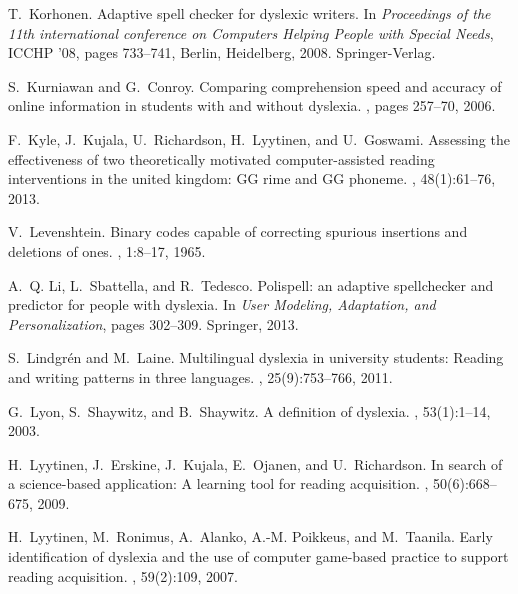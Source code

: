 \documentclass[letterpaper]{sig-alternate-2013}
\begin{document}
\begin{thebibliography}{10}
T.~Korhonen.
\newblock Adaptive spell checker for dyslexic writers.
\newblock In {\em Proceedings of the 11th international conference on Computers
  Helping People with Special Needs}, ICCHP '08, pages 733--741, Berlin,
  Heidelberg, 2008. Springer-Verlag.

S.~Kurniawan and G.~Conroy.
\newblock Comparing comprehension speed and accuracy of online information in
  students with and without dyslexia.
, pages 257--70,
  2006.

F.~Kyle, J.~Kujala, U.~Richardson, H.~Lyytinen, and U.~Goswami.
\newblock Assessing the effectiveness of two theoretically motivated
  computer-assisted reading interventions in the united kingdom: {GG} rime and
  {GG} phoneme.
, 48(1):61--76, 2013.

V.~Levenshtein.
\newblock Binary codes capable of correcting spurious insertions and deletions
  of ones.
, 1:8--17, 1965.

A.~Q. Li, L.~Sbattella, and R.~Tedesco.
\newblock Polispell: an adaptive spellchecker and predictor for people with
  dyslexia.
\newblock In {\em User Modeling, Adaptation, and Personalization}, pages
  302--309. Springer, 2013.

S.~Lindgr{\'e}n and M.~Laine.
\newblock Multilingual dyslexia in university students: Reading and writing
  patterns in three languages.
, 25(9):753--766, 2011.

G.~Lyon, S.~Shaywitz, and B.~Shaywitz.
\newblock A definition of dyslexia.
, 53(1):1--14, 2003.

H.~Lyytinen, J.~Erskine, J.~Kujala, E.~Ojanen, and U.~Richardson.
\newblock In search of a science-based application: A learning tool for reading
  acquisition.
, 50(6):668--675, 2009.

H.~Lyytinen, M.~Ronimus, A.~Alanko, A.-M. Poikkeus, and M.~Taanila.
\newblock Early identification of dyslexia and the use of computer game-based
  practice to support reading acquisition.
, 59(2):109, 2007.


\end{thebibliography}
\end{document}
